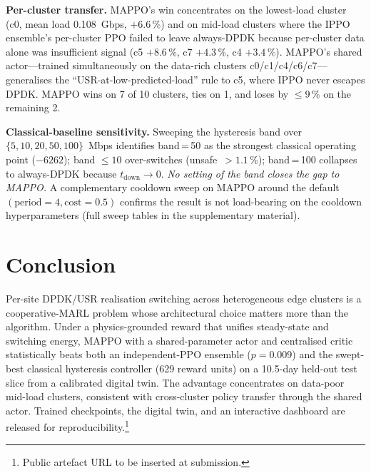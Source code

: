 \documentclass[journal]{IEEEtran}
\begin{document}
\noindent\textbf{Per-cluster transfer.} MAPPO's win concentrates on
the lowest-load cluster (c0, mean load 0.108~Gbps, $+6.6$\,\%) and
on mid-load clusters where the IPPO ensemble's per-cluster PPO
failed to leave always-DPDK because per-cluster data alone was
insufficient signal (c5 $+8.6$\,\%, c7 $+4.3$\,\%, c4 $+3.4$\,\%).
MAPPO's shared actor---trained simultaneously on the data-rich
clusters c0/c1/c4/c6/c7---generalises the
``USR-at-low-predicted-load'' rule to c5, where IPPO never escapes
DPDK. MAPPO wins on 7 of 10 clusters, ties on 1, and loses by
$\leq\!9$\,\% on the remaining 2.

\noindent\textbf{Classical-baseline sensitivity.} Sweeping the
hysteresis band over $\{5, 10, 20, 50, 100\}$~Mbps identifies
band\,=\,50 as the strongest classical operating point
($-6262$); band $\leq\!10$ over-switches
(unsafe~$>\!1.1$\,\%); band\,=\,100 collapses to always-DPDK
because $t_{\mathrm{down}}\!\to\!0$. \emph{No setting of the band
closes the gap to MAPPO.} A complementary cooldown sweep on MAPPO
around the default $(\mathrm{period}\!=\!4, \mathrm{cost}\!=\!0.5)$
confirms the result is not load-bearing on the cooldown
hyperparameters (full sweep tables in the supplementary
material).

\section{Conclusion}
\label{sec:conclusion}
Per-site DPDK/USR realisation switching across heterogeneous edge
clusters is a cooperative-MARL problem whose architectural choice
matters more than the algorithm. Under a physics-grounded reward
that unifies steady-state and switching energy, MAPPO with a
shared-parameter actor and centralised critic statistically beats
both an independent-PPO ensemble ($p\!=\!0.009$) and the swept-best
classical hysteresis controller (629 reward units) on a 10.5-day
held-out test slice from a calibrated digital twin. The advantage
concentrates on data-poor mid-load clusters, consistent with
cross-cluster policy transfer through the shared actor. Trained
checkpoints, the digital twin, and an interactive dashboard are
released for reproducibility.\footnote{Public artefact URL to be
inserted at submission.}
\end{document}
